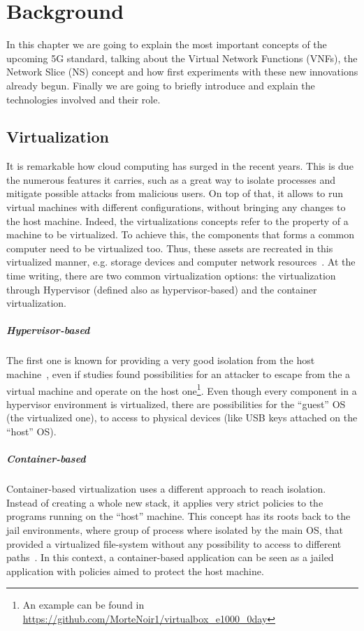 \chapter{Background}
\label{chap:background}

In this chapter we are going to explain the most important concepts of the
upcoming 5G standard, talking about the Virtual Network Functions (VNFs), the
Network Slice (NS) concept and how first experiments with these new innovations
already begun. Finally we are going to briefly introduce and explain the
technologies involved and their role.

\section{Virtualization}
It is remarkable how cloud computing has surged in the recent years. This is due
the numerous features it carries, such as a great way to isolate processes and
mitigate possible attacks from malicious users. On top of that, it allows to run
virtual machines with different configurations, without bringing any changes to
the host machine. Indeed, the virtualizations concepts refer to the property of
a machine to be virtualized. To achieve this, the components that forms a common
computer need to be virtualized too. Thus, these assets are recreated in this
virtualized manner, e.g. storage devices and computer network
resources~\cite{liu2014research}. At the time writing, there are two common
virtualization options: the virtualization through Hypervisor (defined also as
hypervisor-based) and the container virtualization.

\paragraph*{Hypervisor-based}
The first one is known for providing a very good isolation from the host
machine~\cite{eder2016hypervisor}, even if studies found possibilities for an
attacker to escape from the a virtual machine and operate on the host
one\footnote{An example can be found in
  \url{https://github.com/MorteNoir1/virtualbox_e1000_0day}}. Even though every
component in a hypervisor environment is virtualized, there are possibilities
for the ``guest'' OS (the virtualized one), to access to physical devices (like
USB keys attached on the ``host'' OS).

\paragraph*{Container-based}
Container-based virtualization uses a different approach to reach isolation.
Instead of creating a whole new stack, it applies very strict policies to the
programs running on the ``host'' machine. This concept has its roots back to the
jail environments, where group of process where isolated by the main OS, that
provided a virtualized file-system without any possibility to access to
different paths~\cite{canonico2007virtualization}. In this context, a
container-based application can be seen as a jailed application with policies
aimed to protect the host machine.

